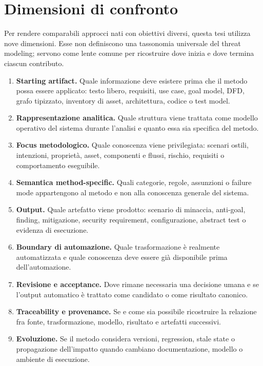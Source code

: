 \documentclass[12pt,a4paper,oneside]{report}
\begin{document}
\section{Dimensioni di confronto}

Per rendere comparabili approcci nati con obiettivi diversi, questa tesi utilizza nove dimensioni. Esse non definiscono una tassonomia universale del threat modeling; servono come lente comune per ricostruire dove inizia e dove termina ciascun contributo.

\begin{enumerate}[label=\textbf{D\arabic*.}, leftmargin=2.1cm]
\item \textbf{Starting artifact.} Quale informazione deve esistere prima che il metodo possa essere applicato: testo libero, requisiti, use case, goal model, DFD, grafo tipizzato, inventory di asset, architettura, codice o test model.
\item \textbf{Rappresentazione analitica.} Quale struttura viene trattata come modello operativo del sistema durante l'analisi e quanto essa sia specifica del metodo.
\item \textbf{Focus metodologico.} Quale conoscenza viene privilegiata: scenari ostili, intenzioni, proprietà, asset, componenti e flussi, rischio, requisiti o comportamento eseguibile.
\item \textbf{Semantica method-specific.} Quali categorie, regole, assunzioni o failure mode appartengono al metodo e non alla conoscenza generale del sistema.
\item \textbf{Output.} Quale artefatto viene prodotto: scenario di minaccia, anti-goal, finding, mitigazione, security requirement, configurazione, abstract test o evidenza di esecuzione.
\item \textbf{Boundary di automazione.} Quale trasformazione è realmente automatizzata e quale conoscenza deve essere già disponibile prima dell'automazione.
\item \textbf{Revisione e acceptance.} Dove rimane necessaria una decisione umana e se l'output automatico è trattato come candidato o come risultato canonico.
\item \textbf{Traceability e provenance.} Se e come sia possibile ricostruire la relazione fra fonte, trasformazione, modello, risultato e artefatti successivi.
\item \textbf{Evoluzione.} Se il metodo considera versioni, regression, stale state o propagazione dell'impatto quando cambiano documentazione, modello o ambiente di esecuzione.
\end{enumerate}
\end{document}
